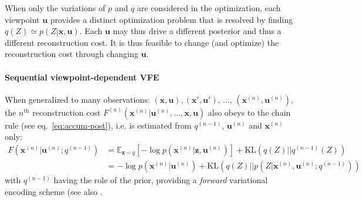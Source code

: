 \documentclass[12pt,twoside,openright]{article}
\begin{document}
When only the variations of $p$ and $q$ are considered in the optimization, each viewpoint $\boldsymbol{u}$ provides a distinct optimization problem that is resolved by finding $q(Z)\simeq p(Z|\boldsymbol{x}, \boldsymbol{u})$. Each $\boldsymbol{u}$ may thus drive a different posterior and thus a different reconstruction cost. It is thus feasible to change (and optimize) the reconstruction cost through changing $\boldsymbol{u}$.

\paragraph{Sequential viewpoint-dependent VFE}

	When generalized to many observations: $(\boldsymbol{x},\boldsymbol{u}), (\boldsymbol{x}',\boldsymbol{u}')$, ..., $(\boldsymbol{x}^{(n)},\boldsymbol{u}^{(n)})$, the $n^\text{th}$ reconstruction cost $F^{(n)}(\boldsymbol{x}^{(n)}|\boldsymbol{u}^{(n)}, ..., \boldsymbol{x}, \boldsymbol{u})$ also obeys to the chain rule (see eq.~\ref{eq:accum-post}), i.e. is estimated from $q^{(n-1)}$, $\boldsymbol{u}^{(n)}$ and $\boldsymbol{x}^{(n)}$ only:
	\begin{align}
	F(\boldsymbol{x}^{(n)}|\boldsymbol{u}^{(n)}; q^{(n-1)}) 
	&= \mathbb{E}_{\boldsymbol{z} \sim q} \left[-\log p(\boldsymbol{x}^{(n)}| \boldsymbol{z}, \boldsymbol{u}^{(n)} )\right] + \text{KL}(q(Z)||q^{(n-1)}(Z))
	\label{eq:FEP-prior-uxun-app}\\
	&= -\log p(\boldsymbol{x}^{(n)}|\boldsymbol{u}^{(n)}) + \text{KL}(q(Z)||p(Z|\boldsymbol{x}^{(n)},\boldsymbol{u}^{(n)};q^{(n-1)}))
	\label{eq:FEP-posterior-uxun-app}
	\end{align}
	with %
	$q^{(n-1)}$ having the role of the prior, providing a \emph{forward} variational encoding scheme (see also \citep{chung2015recurrent,fraccaro2016sequential}.  
	
\end{document}

